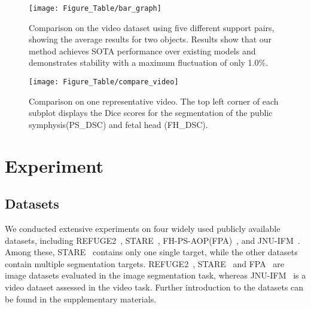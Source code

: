 \begin{figure*}[t]
  \centering
  \setlength{\abovecaptionskip}{3pt}
   \texttt{[image: Figure\_Table/bar\_graph]}
   \caption{Comparison on the video dataset using five different support pairs, showing the average results for two objects. Results show that our method achieves SOTA performance over existing models and demonstrates stability with a maximum fluctuation of only 1.0\%.}
   \label{fig:bar_graph}
   \vspace{-15pt}
\end{figure*}
\begin{figure*}[t]
  \centering
  \setlength{\abovecaptionskip}{3pt}
   \texttt{[image: Figure\_Table/compare\_video]}
   \caption{Comparison on one representative video. The top left corner of each subplot displays the Dice scores for the segmentation of the public symphysis(PS\_DSC) and fetal head (FH\_DSC).}
   \label{fig:compare_video}
   \vspace{-15pt}
\end{figure*}
\section{Experiment}
\label{sec:experiment}

\subsection{Datasets}
We conducted extensive experiments on four widely used publicly available datasets, including REFUGE2~\cite{fang2022refuge2}, STARE~\cite{hoover2000locating}, FH-PS-AOP(FPA)~\cite{jieyun_2023_7851339}, and JNU-IFM~\cite{LU2022107904}. Among these, STARE~\cite{hoover2000locating} contains only one single target, while the other datasets contain multiple segmentation targets. REFUGE2~\cite{fang2022refuge2}, STARE~\cite{hoover2000locating} and FPA~\cite{jieyun_2023_7851339} are image datasets evaluated in the image segmentation task, whereas JNU-IFM~\cite{LU2022107904} is a video dataset assessed in the video task. Further introduction to the datasets can be found in the supplementary materials.

